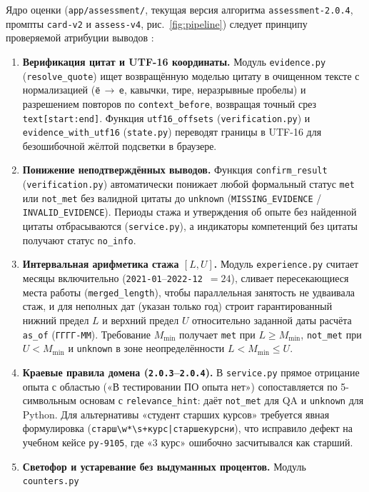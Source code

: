 \documentclass[10pt,a4paper,twocolumn]{article}
\newcommand{\code}[1]{\texttt{#1}}
\begin{document}
Ядро оценки (\code{app/assessment/}, текущая версия алгоритма \code{assessment-2.0.4}, промпты
\code{card-v2} и \code{assess-v4}, рис.~\ref{fig:pipeline}) следует принципу проверяемой
атрибуции выводов \citep{gao2023alce}:
\begin{enumerate}
  \item \textbf{Верификация цитат и UTF-16 координаты.} Модуль \code{evidence.py}
    (\code{resolve\_quote}) ищет возвращённую моделью цитату в очищенном тексте с
    нормализацией (\code{ё}\,$\to$\,\code{е}, кавычки, тире, неразрывные пробелы) и
    разрешением повторов по \code{context\_before}, возвращая точный срез \code{text[start:end]}.
    Функция \code{utf16\_offsets} (\code{verification.py}) и \code{evidence\_with\_utf16}
    (\code{state.py}) переводят границы в UTF-16 для безошибочной жёлтой подсветки в браузере.
  \item \textbf{Понижение неподтверждённых выводов.} Функция \code{confirm\_result}
    (\code{verification.py}) автоматически понижает любой формальный статус \code{met} или
    \code{not\_met} без валидной цитаты до \code{unknown} (\code{MISSING\_EVIDENCE} /
    \code{INVALID\_EVIDENCE}). Периоды стажа и утверждения об опыте без найденной цитаты
    отбрасываются (\code{service.py}), а индикаторы компетенций без цитаты получают статус
    \code{no\_info}.
  \item \textbf{Интервальная арифметика стажа $[L, U]$.} Модуль \code{experience.py} считает
    месяцы включительно (\code{2021-01}--\code{2022-12}~$= 24$), сливает пересекающиеся места
    работы (\code{merged\_length}), чтобы параллельная занятость не удваивала стаж, и для
    неполных дат (указан только год) строит гарантированный нижний предел $L$ и верхний предел
    $U$ относительно заданной даты расчёта \code{as\_of} (\code{ГГГГ-ММ}). Требование
    $M_{\min}$ получает \code{met} при $L \ge M_{\min}$, \code{not\_met} при $U < M_{\min}$ и
    \code{unknown} в зоне неопределённости $L < M_{\min} \le U$.
  \item \textbf{Краевые правила домена (\code{2.0.3}--\code{2.0.4}).} В \code{service.py}
    прямое отрицание опыта с областью («В тестировании ПО опыта нет») сопоставляется по
    5-символьным основам с \code{relevance\_hint}: даёт \code{not\_met} для QA и
    \code{unknown} для Python. Для альтернативы «студент старших курсов» требуется явная
    формулировка (\code{старш\textbackslash w*\textbackslash s+курс|старшекурсни}), что
    исправило дефект на учебном кейсе \code{py-9105}, где «3 курс» ошибочно засчитывался как
    старший.
  \item \textbf{Светофор и устаревание без выдуманных процентов.} Модуль \code{counters.py}

\end{enumerate}
\end{document}
